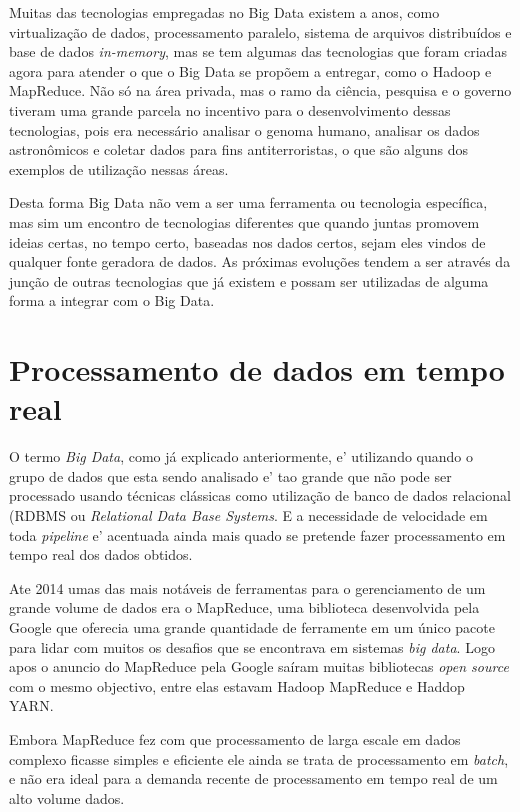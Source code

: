 Muitas das tecnologias empregadas no Big Data existem a anos, como virtualização de dados, processamento paralelo, sistema de arquivos distribuídos e base de dados \textit{in-memory}, mas se tem algumas das tecnologias que foram criadas agora para atender o que o Big Data se propõem a entregar, como o Hadoop e MapReduce. Não só na área privada, mas o ramo da ciência, pesquisa e o governo tiveram uma grande parcela no incentivo para o desenvolvimento dessas tecnologias, pois era necessário analisar o genoma humano, analisar os dados astronômicos e coletar dados para fins antiterroristas, o que são alguns dos exemplos de utilização nessas áreas.~\cite{leigos}

Desta forma Big Data não vem a ser uma ferramenta ou tecnologia específica, mas sim um encontro de tecnologias diferentes que quando juntas promovem ideias certas, no tempo certo, baseadas nos dados certos, sejam eles vindos de qualquer fonte geradora de dados. As próximas evoluções tendem a ser através da junção de outras tecnologias que já existem e possam ser utilizadas de alguma forma a integrar com o Big Data.~\cite{leigos}

\section{Processamento de dados em tempo real}
O termo \textit{Big Data}, como já explicado anteriormente, e' utilizando quando o grupo de dados que esta sendo analisado e' tao grande que não pode ser processado usando técnicas clássicas como utilização de banco de dados relacional (RDBMS ou \textit{Relational Data Base Systems}. E a necessidade de velocidade em toda \textit{pipeline} e' acentuada ainda mais quado se pretende fazer processamento em tempo real dos dados obtidos.

Ate 2014 umas das mais notáveis de ferramentas para o gerenciamento de um grande volume de dados era o MapReduce, uma biblioteca desenvolvida pela Google que oferecia uma grande quantidade de ferramente em um único pacote para lidar com muitos os desafios que se encontrava em sistemas \textit{big data}. Logo apos o anuncio do MapReduce pela Google saíram muitas bibliotecas \textit{open source} com o mesmo objectivo, entre elas estavam  Hadoop MapReduce e Haddop YARN.

Embora MapReduce fez com que processamento de larga escale em dados complexo ficasse simples e eficiente ele ainda se trata de processamento em \textit{batch}, e não era ideal para a demanda recente de processamento em tempo real de um alto volume dados.

